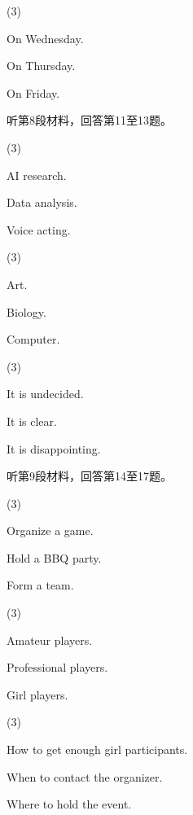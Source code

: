 \documentclass{英语试卷}
\begin{document}
\begin{choices}(3)
  \item On Wednesday.
  \item On Thursday.
  \item On Friday.
\end{choices}
\par 听第8段材料，回答第11至13题。\par
{}
\begin{choices}(3)
  \item AI research.
  \item Data analysis.
  \item Voice acting.
\end{choices}
\begin{choices}(3)
  \item Art.
  \item Biology.
  \item Computer.
\end{choices}
\begin{choices}(3)
  \item It is undecided.
  \item It is clear.
  \item It is disappointing.
\end{choices}
\par 听第9段材料，回答第14至17题。\par
{}
\begin{choices}(3)
  \item Organize a game.
  \item Hold a BBQ party.
  \item Form a team.
\end{choices}
\begin{choices}(3)
  \item Amateur players.
  \item Professional players.
  \item Girl players.
\end{choices}
\begin{choices}(3)
  \item How to get enough girl participants.
  \item When to contact the organizer.
  \item Where to hold the event.
\end{choices}
\end{document}

